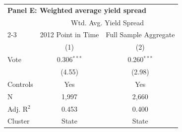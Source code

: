 \begingroup
\centering
\begin{tabular*}{\textwidth}{@{\extracolsep{\fill}}lcc}
\multicolumn{3}{l}{\textbf{Panel E: Weighted average yield spread}}\\

\addlinespace
   \toprule
     & \multicolumn{2}{c}{Wtd. Avg. Yield Spread} \\ 
   \cmidrule(lr){2-3}
                  & 2012 Point in Time & Full Sample Aggregate \\   
                  & (1)                & (2)\\  
   \midrule 
   Vote           & 0.306$^{***}$      & 0.260$^{***}$\\   
                  & (4.55)            & (2.98)\\   
   \hline
   Controls       & Yes & Yes\\
   N   & 1,997              & 2,660\\  
   Adj. R$^2$ & 0.453              & 0.400\\  
   Cluster              & State & State\\  
   \bottomrule
\end{tabular*}
\par\endgroup
